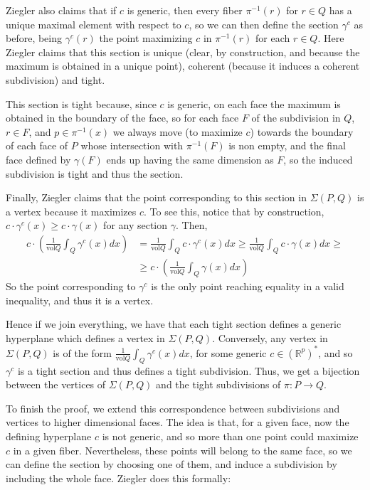 \documentclass[12pt,a4paper]{article}
\newcommand{\RR}{\mathbb{R}}
\newcommand{\vol}{\text{vol}}
\begin{document}
Ziegler also claims that if $c$ is generic, then every fiber $\pi^{-1}(r)$ for $r \in Q$ has a unique maximal element with respect to $c$, so we can then define the section $\gamma^c$ as before, being $\gamma^c(r)$ the point maximizing $c$ in $\pi^{-1}(r)$ for each $r\in Q$. 
Here Ziegler claims that this section is unique (clear, by construction, and because the maximum is obtained in a unique point), coherent (because it induces a coherent subdivision) and tight. 

This section is tight because, since $c$ is generic, on each face the maximum is obtained in the boundary of the face, so for each face $F$ of the subdivision in $Q$, $r\in F$, and $p\in \pi^{-1}(x)$ we always move (to maximize $c$) towards the boundary of each face of $P$ whose intersection with $\pi^{-1}(F)$ is non empty, and the final face defined by $\gamma(F)$ ends up having the same dimension as $F$, so the induced subdivision is tight and thus the section. 

Finally, Ziegler claims that the point corresponding to this section in $\Sigma(P,Q)$ is a vertex because it maximizes $c$. To see this, notice that by construction, $c\cdot \gamma^c(x)\geq c \cdot \gamma(x)$ for any section $\gamma$. Then, 
\begin{displaymath}
\begin{split}
c\cdot \left( \frac{1}{\vol Q} \int_Q \gamma^c(x)dx\right) & =  \frac{1}{\vol Q} \int_Q c\cdot \gamma^c(x)dx \geq \frac{1}{\vol Q} \int_Q c\cdot \gamma(x)dx \geq  \\
& \geq c\cdot \left( \frac{1}{\vol Q} \int_Q \gamma(x)dx\right)
\end{split}
\end{displaymath}
So the point corresponding to $\gamma^c$ is the only point reaching equality in a valid inequality, and thus it is a vertex.

Hence if we join everything, we have that each tight section defines a generic hyperplane which defines a vertex in $\Sigma(P,Q)$.
Conversely, any vertex in $\Sigma(P,Q)$ is of the form $\frac{1}{\vol Q} \int_Q \gamma^c(x)dx$, for some generic $c\in (\RR^p)^*$, and so $\gamma^c$ is a tight section and thus defines a tight subdivision. Thus, we get a bijection between the vertices of $\Sigma(P,Q)$ and the tight subdivisions of $\pi\colon P\to Q$.

To finish the proof, we extend this correspondence between subdivisions and vertices to higher dimensional faces. 
The idea is that, for a given face, now the defining hyperplane $c$ is not generic, and so more than one point could maximize $c$ in a given fiber. Nevertheless, these points will belong to the same face, so we can define the section by choosing one of them, and induce a subdivision by including the whole face. 
Ziegler does this formally:
\end{document}
